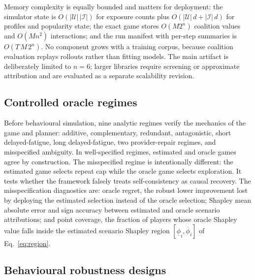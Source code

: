 \documentclass[pdflatex,sn-mathphys-num]{sn-jnl}
\theoremstyle{thmstyleone}
\theoremstyle{thmstyletwo}
\theoremstyle{thmstylethree}
\newcommand{\Shap}{\phi}
\begin{document}
Memory complexity is equally bounded and matters for deployment: the simulator state is $O(|\mathcal{U}|\,|\mathcal{I}|)$ for exposure counts plus $O(|\mathcal{U}|\,d+|\mathcal{I}|\,d)$ for profiles and popularity state; the exact game stores $O(M2^n)$ coalition values and $O(Mn^2)$ interactions; and the run manifest with per-step summaries is $O(T\,M\,2^n)$. No component grows with a training corpus, because coalition evaluation replays rollouts rather than fitting models. The main artifact is deliberately limited to $n=6$; larger libraries require screening or approximate attribution and are evaluated as a separate scalability revision.

\subsection{Controlled oracle regimes}

Before behavioural simulation, nine analytic regimes verify the mechanics of the game and planner: additive, complementary, redundant, antagonistic, short delayed-fatigue, long delayed-fatigue, two provider-repair regimes, and misspecified ambiguity. In well-specified regimes, estimated and oracle games agree by construction. The misspecified regime is intentionally different: the estimated game selects repeat cap while the oracle game selects exploration. It tests whether the framework falsely treats self-consistency as causal recovery. The misspecification diagnostics are: oracle regret, the robust lower improvement lost by deploying the estimated selection instead of the oracle selection; Shapley mean absolute error and sign accuracy between estimated and oracle scenario attributions; and point coverage, the fraction of players whose oracle Shapley value falls inside the estimated scenario Shapley region $[\underline{\Shap}_i,\overline{\Shap}_i]$ of Eq.~\eqref{eq:region}.



\subsection{Behavioural robustness designs}
\end{document}
